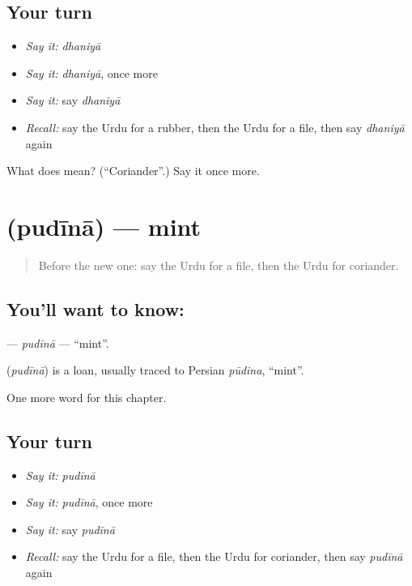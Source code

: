 \subsection*{Your turn}
\begin{itemize}
\raggedright
  \item \emph{Say it:} \emph{dhaniyā}
  \item \emph{Say it:} \emph{dhaniyā}, once more
  \item \emph{Say it:} say \emph{dhaniyā}
  \item \emph{Recall:} say the Urdu for a rubber, then the Urdu for a file, then say \emph{dhaniyā} again
\end{itemize}

\begin{tcolorbox}[breakable,colback=teal!4,colframe=teal!35!black,title={Before you move on}]
What does  mean? (\textquotedblleft{}Coriander\textquotedblright{}.) Say it once more.
\end{tcolorbox}
\section[\texorpdfstring{\ur{پودینہ} (pudīnā)}{پودینہ (pudīnā)}]{ (pudīnā) — mint}

\label{lesson:UR-C226-pudina}



\begin{quote}
Before the new one: say the Urdu for a file, then the Urdu for coriander.
\end{quote}

\subsection*{You'll want to know: }
\textbf{} — \emph{pudīnā} — \textquotedblleft{}mint\textquotedblright{}.

\begin{cousinweb}
\textbf{} (\emph{pudīnā}) is a loan, usually traced to Persian \emph{pūdina}, \textquotedblleft{}mint\textquotedblright{}.
\end{cousinweb}

\begin{grammarlens}[title={What you've built}]
One more word for this chapter.
\end{grammarlens}

\subsection*{Your turn}
\begin{itemize}
\raggedright
  \item \emph{Say it:} \emph{pudīnā}
  \item \emph{Say it:} \emph{pudīnā}, once more
  \item \emph{Say it:} say \emph{pudīnā}
  \item \emph{Recall:} say the Urdu for a file, then the Urdu for coriander, then say \emph{pudīnā} again
\end{itemize}

